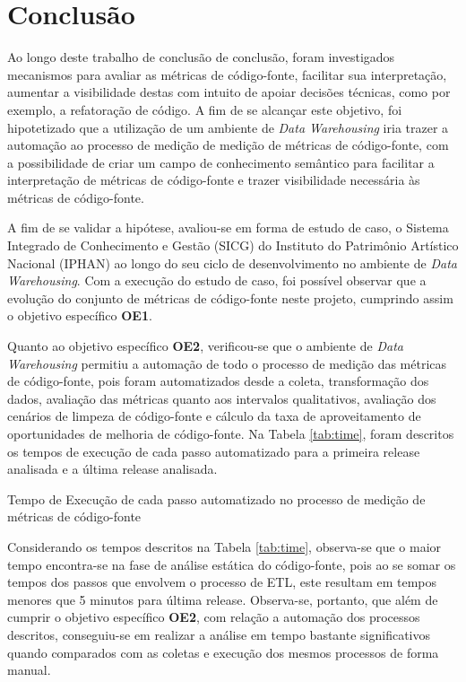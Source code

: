 \chapter{Conclusão}


Ao longo deste trabalho de conclusão de conclusão, foram investigados mecanismos para avaliar as métricas de código-fonte, facilitar sua interpretação, aumentar a visibilidade destas com intuito de apoiar decisões técnicas, como por exemplo, a refatoração de código. A fim de se alcançar este objetivo, foi hipotetizado que a utilização de um ambiente de \textit{Data Warehousing} iria trazer a automação ao processo de medição de medição de métricas de código-fonte, com a possibilidade de criar um campo de conhecimento semântico para facilitar a interpretação de métricas de código-fonte e trazer visibilidade necessária às métricas de código-fonte.


A fim de se validar a hipótese, avaliou-se em forma de estudo de caso, o Sistema Integrado de Conhecimento e Gestão (SICG) do Instituto do Patrimônio Artístico Nacional (IPHAN) ao longo do seu ciclo de desenvolvimento no ambiente de \textit{Data Warehousing}. Com a execução do estudo de caso, foi possível observar que a evolução do conjunto de métricas de código-fonte neste projeto, cumprindo assim o objetivo específico \textbf{OE1}.

Quanto ao objetivo específico \textbf{OE2}, verificou-se que o ambiente de \textit{Data Warehousing} permitiu a automação de todo o processo de medição das métricas de código-fonte, pois foram automatizados desde a coleta, transformação dos dados, avaliação das métricas quanto aos intervalos qualitativos, avaliação dos cenários de limpeza de código-fonte e cálculo da taxa de aproveitamento de oportunidades de melhoria de código-fonte. Na Tabela \ref{tab:time}, foram descritos os tempos de execução de cada passo automatizado para a primeira release analisada e a última release analisada.

\begin{table}[!ht]
\centering

\caption{Tempo de Execução de cada passo automatizado no processo de medição de métricas de código-fonte}
\label{tab:time}
\end{table}
\FloatBarrier

Considerando os tempos descritos na Tabela \ref{tab:time}, observa-se que o maior tempo encontra-se na fase de análise estática do código-fonte, pois ao se somar os tempos dos passos que envolvem o processo de ETL, este resultam em tempos menores que 5 minutos para última release. Observa-se, portanto, que além de cumprir o objetivo específico \textbf{OE2}, com relação a automação dos processos descritos, conseguiu-se em realizar a análise em tempo bastante significativos quando comparados com as coletas e execução dos mesmos processos de forma manual.  

